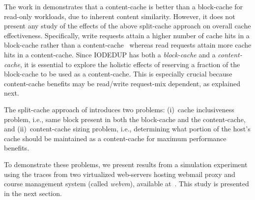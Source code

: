 The work in \cite{iodedup} demonstrates that a content-cache 
is better than a block-cache for read-only workloads,
due to inherent content similarity.
However, it does not present any study of the effects of the above
split-cache approach on overall cache effectiveness.
Specifically,
write requests attain a higher number of cache hits in a block-cache rather
than a content-cache~\cite{iodedup} whereas read requests attain more 
cache hits in a content-cache. 
Since IODEDUP has both a \textit{block-cache} and a \textit{content-cache}, 
it is essential to explore the holistic effects of reserving a fraction of the
block-cache to be used as a content-cache. This is especially
crucial because content-cache benefits may be read/write 
request-mix dependent, as explained next.

The split-cache approach of \cite{iodedup} introduces two problems:
(i)~cache inclusiveness problem, i.e.,
same block present in both the block-cache and the content-cache, and
(ii)~content-cache sizing problem, i.e., determining what portion of 
the host's cache should be maintained as a content-cache
for maximum performance benefits.

To demonstrate these problems, we present results from a simulation experiment
using the traces from two virtualized web-servers hosting 
webmail proxy and course management system (called \textit{webvm}),
available at~\cite{iodedup-online}. This study is presented in the next 
section.

